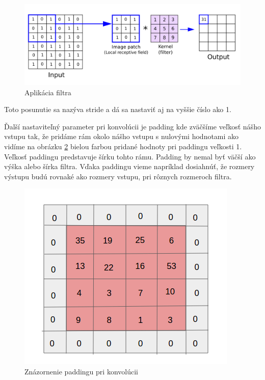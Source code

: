 \begin{figure}[H]
\includegraphics[width=\textwidth]{images/filter.png}
\centering
\caption{Aplikácia filtra}
\label{fig:image301}
\end{figure}

Toto posunutie sa nazýva stride a dá sa nastaviť aj na vyššie číslo ako 1.

Ďalší nastaviteľný parameter pri konvolúcii je padding kde zväčšíme veľkosť nášho vstupu tak, že pridáme rám okolo nášho vstupu s nulovými hodnotami ako vidíme na obrázku \ref{fig:image302} bielou farbou pridané hodnoty pri paddingu veľkosti 1. Veľkosť paddingu predstavuje šírku tohto rámu. Padding by nemal byť väčší ako výška alebo šírka filtra. Vďaka paddingu vieme napríklad dosiahnúť, že rozmery výstupu budú rovnaké ako rozmery vstupu, pri rôznych rozmeroch filtra.

\begin{figure}[H]
\includegraphics[width=\textwidth]{images/padding.png}
\centering
\caption{Znázornenie paddingu pri konvolúcii}
\label{fig:image302}
\end{figure}

